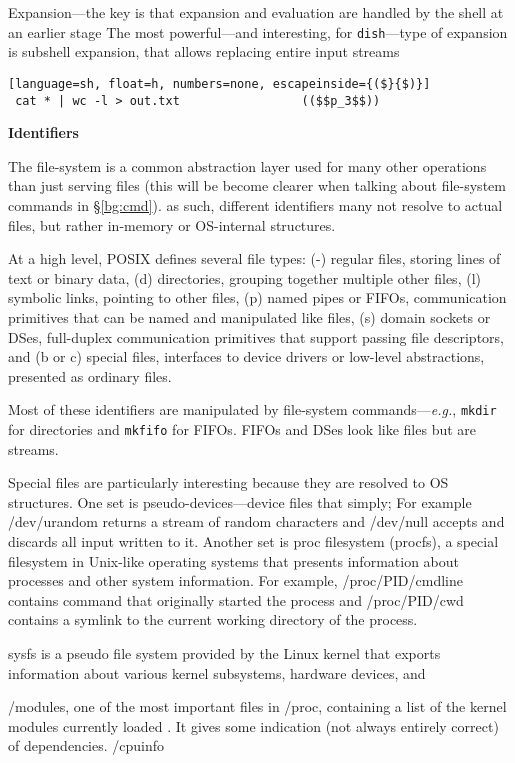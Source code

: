 \documentclass[sigplan,10pt,review,anonymous]{acmart}
\newcommand{\eg}{{\em e.g.}, }
\newcommand{\heading}[1]{\vspace{4pt}\noindent\textbf{#1}\enspace}
\newcommand{\ttt}[1]{\texttt{\small #1}}
\begin{document}
Expansion---the key is that expansion and evaluation are handled by the shell at an earlier stage 
The most powerful---and interesting, for \ttt{dish}---type of expansion is subshell expansion, that allows replacing entire input streams 


\begin{lstlisting}[language=sh, float=h, numbers=none, escapeinside={($}{$)}]
 cat * | wc -l > out.txt                 (($$p_3$$))
\end{lstlisting}

\heading{Identifiers}

The file-system is a common abstraction layer used for many other operations than just serving files (this will be become clearer when talking about file-system commands in \S\ref{bg:cmd}).
as such, different identifiers many not resolve to actual files, but rather in-memory or OS-internal structures.

At a high level, POSIX defines several file types:
(-) regular files, storing lines of text or binary data,
(d) directories, grouping together multiple other files,
(l) symbolic links, pointing to other files,
(p) named pipes or FIFOs, communication primitives that can be named and manipulated like files,
(s) domain sockets or DSes, full-duplex communication primitives that support passing file descriptors, and
(b or c) special files, interfaces to device drivers or low-level abstractions, presented as ordinary files.

Most of these identifiers are manipulated by file-system commands---\eg \ttt{mkdir} for directories and \ttt{mkfifo} for FIFOs.
FIFOs and DSes look like files but are streams.

Special files are particularly interesting because they are resolved to OS structures.
One set is pseudo-devices---device files that simply;
For example /dev/urandom returns a stream of random characters and /dev/null accepts and discards all input written to it.
Another set is proc filesystem (procfs), a special filesystem in Unix-like operating systems that presents information about processes and other system information.
For example, /proc/PID/cmdline contains command that originally started the process and /proc/PID/cwd contains a symlink to the current working directory of the process.

sysfs is a pseudo file system provided by the Linux kernel that exports information about various kernel subsystems, hardware devices, and 

/modules, one of the most important files in /proc, containing a list of the kernel modules currently loaded . It gives some indication (not always entirely correct) of dependencies.
/cpuinfo
\end{document}
